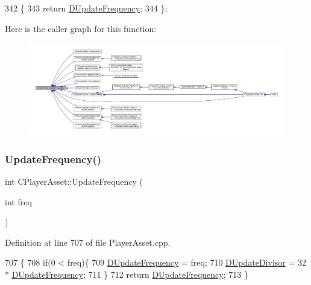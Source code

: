 \begin{DoxyCode}
342                                     \{
343             \textcolor{keywordflow}{return} \hyperlink{classCPlayerAsset_ade2147d67ec25b0280d5f11a89dd0dc5}{DUpdateFrequency};
344         \};
\end{DoxyCode}
Here is the caller graph for this function\+:
\nopagebreak
\begin{figure}[H]
\begin{center}
\leavevmode
\includegraphics[width=350pt]{classCPlayerAsset_a0aff85b9552967a42f4f3f42cb59c19f_icgraph}
\end{center}
\end{figure}
\hypertarget{classCPlayerAsset_ad53a2f58bcbccb7995431e8e2d050c09}{}\label{classCPlayerAsset_ad53a2f58bcbccb7995431e8e2d050c09} 
\subsubsection{\texorpdfstring{Update\+Frequency()}{UpdateFrequency()}\hspace{0.1cm}{\footnotesize\ttfamily [2/2]}}
{\footnotesize\ttfamily int C\+Player\+Asset\+::\+Update\+Frequency (\begin{DoxyParamCaption}\item[{int}]{freq }\end{DoxyParamCaption})\hspace{0.3cm}{\ttfamily [static]}}



Definition at line 707 of file Player\+Asset.\+cpp.


\begin{DoxyCode}
707                                          \{
708     \textcolor{keywordflow}{if}(0 < freq)\{
709        \hyperlink{classCPlayerAsset_ade2147d67ec25b0280d5f11a89dd0dc5}{DUpdateFrequency} = freq;
710        \hyperlink{classCPlayerAsset_a09d17faf2ad70e2f778095a3c314d398}{DUpdateDivisor} = 32 * \hyperlink{classCPlayerAsset_ade2147d67ec25b0280d5f11a89dd0dc5}{DUpdateFrequency};
711     \}
712     \textcolor{keywordflow}{return} \hyperlink{classCPlayerAsset_ade2147d67ec25b0280d5f11a89dd0dc5}{DUpdateFrequency};
713 \}
\end{DoxyCode}


